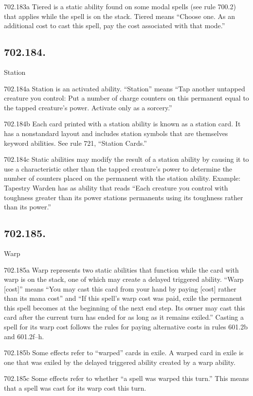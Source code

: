 702.183a Tiered is a static ability found on some modal spells (see rule 700.2) that applies while the spell is on the stack. Tiered means “Choose one. As an additional cost to cast this spell, pay the cost associated with that mode.”

\subsection*{702.184.}
Station

702.184a Station is an activated ability. “Station” means “Tap another untapped creature you control: Put a number of charge counters on this permanent equal to the tapped creature’s power. Activate only as a sorcery.”

702.184b Each card printed with a station ability is known as a station card. It has a nonstandard layout and includes station symbols that are themselves keyword abilities. See rule 721, “Station Cards.”

702.184c Static abilities may modify the result of a station ability by causing it to use a characteristic other than the tapped creature’s power to determine the number of counters placed on the permanent with the station ability.
Example: Tapestry Warden has as ability that reads “Each creature you control with toughness greater than its power stations permanents using its toughness rather than its power.”

\subsection*{702.185.}
Warp

702.185a Warp represents two static abilities that function while the card with warp is on the stack, one of which may create a delayed triggered ability. “Warp [cost]” means “You may cast this card from your hand by paying [cost] rather than its mana cost” and “If this spell’s warp cost was paid, exile the permanent this spell becomes at the beginning of the next end step. Its owner may cast this card after the current turn has ended for as long as it remains exiled.” Casting a spell for its warp cost follows the rules for paying alternative costs in rules 601.2b and 601.2f–h.

702.185b Some effects refer to “warped” cards in exile. A warped card in exile is one that was exiled by the delayed triggered ability created by a warp ability.

702.185c Some effects refer to whether “a spell was warped this turn.” This means that a spell was cast for its warp cost this turn.

